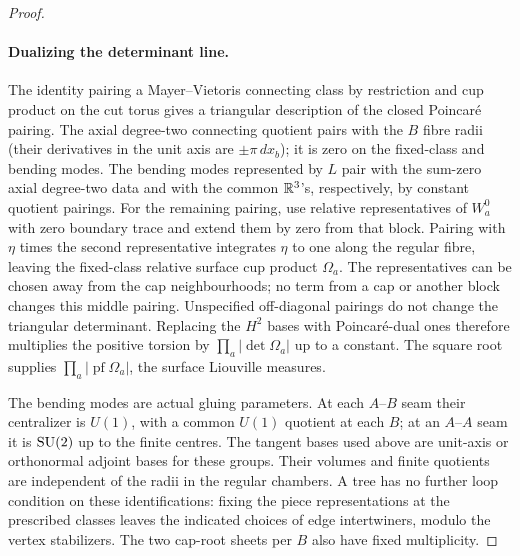 \begin{proof}
\paragraph{Dualizing the determinant line.}
The identity pairing a Mayer--Vietoris connecting class by restriction and cup product on the cut torus gives a triangular description of the closed Poincar\'e pairing. The axial degree-two connecting quotient pairs with the \(B\) fibre radii (their derivatives in the unit axis are \(\pm\pi\,dx_b\)); it is zero on the fixed-class and bending modes. The bending modes represented by \(L\) pair with the sum-zero axial degree-two data and with the common \(\mathbb R^3\)'s, respectively, by constant quotient pairings. For the remaining pairing, use relative representatives of \(W_a^0\) with zero boundary trace and extend them by zero from that block. Pairing with \(\eta\) times the second representative integrates \(\eta\) to one along the regular fibre, leaving the fixed-class relative surface cup product \(\Omega_a\). The representatives can be chosen away from the cap neighbourhoods; no term from a cap or another block changes this middle pairing. Unspecified off-diagonal pairings do not change the triangular determinant. Replacing the \(H^2\) bases with Poincar\'e-dual ones therefore multiplies the positive torsion by \(\prod_a|\det\Omega_a|\) up to a constant. The square root supplies \(\prod_a|\operatorname{pf}\Omega_a|\), the surface Liouville measures.

The bending modes are actual gluing parameters. At each \(A\)--\(B\) seam their centralizer is \(U(1)\), with a common \(U(1)\) quotient at each \(B\); at an \(A\)--\(A\) seam it is \(\mathrm{SU}(2)\) up to the finite centres. The tangent bases used above are unit-axis or orthonormal adjoint bases for these groups. Their volumes and finite quotients are independent of the radii in the regular chambers. A tree has no further loop condition on these identifications: fixing the piece representations at the prescribed classes leaves the indicated choices of edge intertwiners, modulo the vertex stabilizers. The two cap-root sheets per \(B\) also have fixed multiplicity.


\end{proof}
